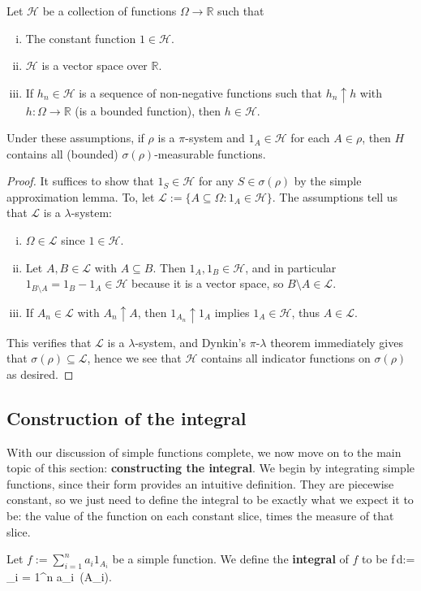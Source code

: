 \begin{theorem}
	Let $\mathcal H$ be a collection of functions $\Omega\rightarrow\mathbb R$ such that
	\begin{enumerate}[i)]
		\item The constant function $1\in\mathcal H$. 
		\item $\mathcal H$ is a vector space over $\mathbb R$. 
		\item If $h_n\in\mathcal H$ is a sequence of non-negative functions such that $h_n\uparrow h$ with $h : \Omega\rightarrow\mathbb R$ (is a bounded function), then $h\in\mathcal H$. 
	\end{enumerate}
	Under these assumptions, if $\rho$ is a $\pi$-system and $1_A\in\mathcal H$ for each $A\in\rho$, then $H$ contains all (bounded) $\sigma(\rho)$-measurable functions. 
\end{theorem}
\begin{proof}
	It suffices to show that $1_S\in\mathcal H$ for any $S\in\sigma(\rho)$ by the simple approximation lemma. To, let $\mathcal L := \{A\subseteq\Omega : 1_A\in\mathcal H\}$. The assumptions tell us that $\mathcal L$ is a $\lambda$-system:
	\begin{enumerate}[i)]
		\item $\Omega\in\mathcal L$ since $1\in\mathcal H$. 
		\item Let $A, B\in\mathcal L$ with $A\subseteq B$. Then $1_A, 1_B\in\mathcal H$, and in particular $1_{B\setminus A} = 1_B - 1_A\in\mathcal H$ because it is a vector space, so $B\setminus A\in\mathcal L$. 
		\item If $A_n\in\mathcal L$ with $A_n\uparrow A$, then $1_{A_n}\uparrow 1_A$ implies $1_A\in\mathcal H$, thus $A\in\mathcal L$. 
	\end{enumerate}
	This verifies that $\mathcal L$ is a $\lambda$-system, and Dynkin's $\pi$-$\lambda$ theorem immediately gives that $\sigma(\rho)\subseteq\mathcal L$, hence we see that $\mathcal H$ contains all indicator functions on $\sigma(\rho)$ as desired. 
\end{proof}

\subsection{Construction of the integral}

With our discussion of simple functions complete, we now move on to the main topic of this section: \textbf{constructing the integral}. We begin by integrating simple functions, since their form provides an intuitive definition. They are piecewise constant, so we just need to define the integral to be exactly what we expect it to be: the value of the function on each constant slice, times the measure of that slice. 
\begin{definition}
	Let $f := \sum_{i = 1}^n a_i 1_{A_i}$ be a simple function. We define the \textbf{integral} of $f$ to be
	\eq
		\int f\,d\mu := \sum_{i = 1}^n a_i\, \mu(A_i).
	\qe
\end{definition}

